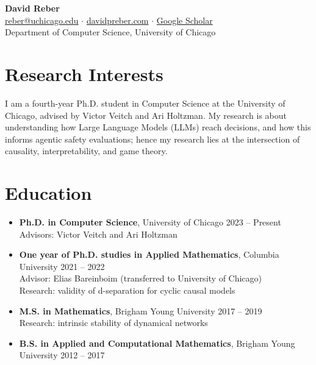 \documentclass[11pt,letterpaper]{article}
\begin{document}
\begin{center}
    {\LARGE \textbf{David Reber}} \\[0.2em]
    \href{mailto:reber@uchicago.edu}{reber@uchicago.edu} $\cdot$ 
    \href{https://davidpreber.com}{davidpreber.com} $\cdot$ 
    \href{https://scholar.google.com/citations?user=8MXWn9gAAAAJ}{Google Scholar} \\
    Department of Computer Science, University of Chicago
\end{center}

\section*{Research Interests}

I am a fourth-year Ph.D. student in Computer Science at the University of Chicago, advised by Victor Veitch and Ari Holtzman. My research is about understanding how Large Language Models (LLMs) reach decisions, and how this informs agentic safety evaluations; hence my research lies at the intersection of causality, interpretability, and game theory.

\section*{Education}

\begin{itemize}[leftmargin=*]
    \item \textbf{Ph.D. in Computer Science}, University of Chicago \hfill 2023 -- Present \\
    Advisors: Victor Veitch and Ari Holtzman

    \item \textbf{One year of Ph.D. studies in Applied Mathematics}, Columbia University \hfill 2021 -- 2022 \\
    Advisor: Elias Bareinboim (transferred to University of Chicago) \\
    Research: validity of d-separation for cyclic causal models

    \item \textbf{M.S. in Mathematics}, Brigham Young University \hfill 2017 -- 2019 \\
    Research: intrinsic stability of dynamical networks

    \item \textbf{B.S. in Applied and Computational Mathematics}, Brigham Young University \hfill 2012 -- 2017
\end{itemize}
\end{document}
